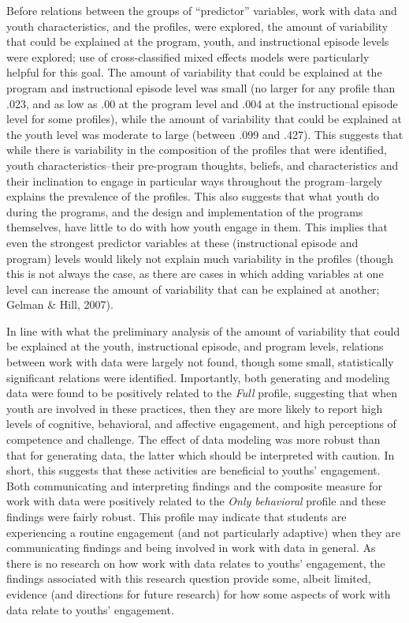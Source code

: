 \documentclass[]{book}
\theoremstyle{definition}
\theoremstyle{definition}
\theoremstyle{definition}
\theoremstyle{remark}
\begin{document}
Before relations between the groups of ``predictor'' variables, work
with data and youth characteristics, and the profiles, were explored,
the amount of variability that could be explained at the program, youth,
and instructional episode levels were explored; use of cross-classified
mixed effects models were particularly helpful for this goal. The amount
of variability that could be explained at the program and instructional
episode level was small (no larger for any profile than .023, and as low
as .00 at the program level and .004 at the instructional episode level
for some profiles), while the amount of variability that could be
explained at the youth level was moderate to large (between .099 and
.427). This suggests that while there is variability in the composition
of the profiles that were identified, youth characteristics--their
pre-program thoughts, beliefs, and characteristics and their inclination
to engage in particular ways throughout the program--largely explains
the prevalence of the profiles. This also suggests that what youth do
during the programs, and the design and implementation of the programs
themselves, have little to do with how youth engage in them. This
implies that even the strongest predictor variables at these
(instructional episode and program) levels would likely not explain much
variability in the profiles (though this is not always the case, as
there are cases in which adding variables at one level can increase the
amount of variability that can be explained at another; Gelman \& Hill,
2007).

In line with what the preliminary analysis of the amount of variability
that could be explained at the youth, instructional episode, and program
levels, relations between work with data were largely not found, though
some small, statistically significant relations were identified.
Importantly, both generating and modeling data were found to be
positively related to the \emph{Full} profile, suggesting that when
youth are involved in these practices, then they are more likely to
report high levels of cognitive, behavioral, and affective engagement,
and high perceptions of competence and challenge. The effect of data
modeling was more robust than that for generating data, the latter which
should be interpreted with caution. In short, this suggests that these
activities are beneficial to youths' engagement. Both communicating and
interpreting findings and the composite measure for work with data were
positively related to the \emph{Only behavioral} profile and these
findings were fairly robust. This profile may indicate that students are
experiencing a routine engagement (and not particularly adaptive) when
they are communicating findings and being involved in work with data in
general. As there is no research on how work with data relates to
youths' engagement, the findings associated with this research question
provide some, albeit limited, evidence (and directions for future
research) for how some aspects of work with data relate to youths'
engagement.
\end{document}
